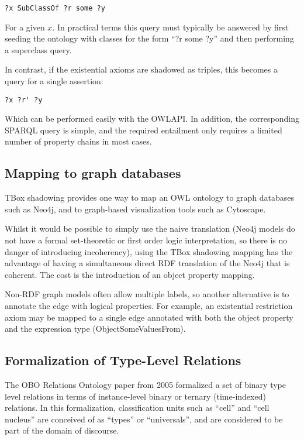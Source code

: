 \documentclass{my}
\begin{document}
\begin{verbatim}
?x SubClassOf ?r some ?y
\end{verbatim}

For a given $x$. In practical terms this query must typically be
answered by first seeding the ontology with classes for the form ``?r
some ?y'' and then performing a superclass query.

In contrast, if the existential axioms are shadowed as triples, this
becomes a query for a single assertion:

\begin{verbatim}
?x ?r' ?y
\end{verbatim}

Which can be performed easily with the OWLAPI. In addition, the
corresponding SPARQL query is simple, and the required entailment only
requires a limited number of property chains in most cases.

\subsection{Mapping to graph databases}

TBox shadowing provides one way to map an OWL ontology to graph
databases such as Neo4j, and to graph-based visualization tools such
as Cytoscape.

Whilst it would be possible to simply use the naive translation (Neo4j
models do not have a formal set-theoretic or first order logic
interpretation, so there is no danger of introducing incoherency),
using the TBox shadowing mapping has the advantage of having a
simultaneous direct RDF translation of the Neo4j that is coherent. The
cost is the introduction of an object property mapping.

Non-RDF graph models often allow multiple labels, so another
alternative is to annotate the edge with logical properties. For
example, an existential restriction axiom may be mapped to a single
edge annotated with both the object property and the expression type
(ObjectSomeValuesFrom). 

\subsection{Formalization of Type-Level Relations}

The OBO Relations Ontology paper from 2005\cite{Smith2005} formalized
a set of binary type level relations in terms of instance-level binary
or ternary (time-indexed) relations. In this formalization,
classification units such as ``cell'' and ``cell nucleus'' are
conceived of as ``types'' or ``universals'', and are considered to be
part of the domain of discourse.
\end{document}

